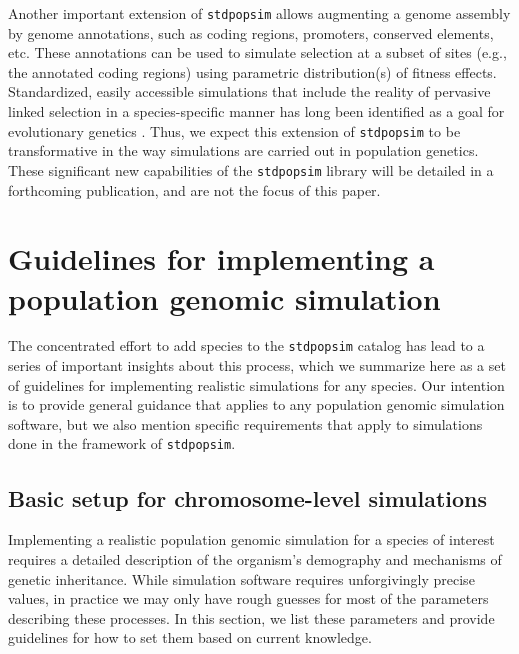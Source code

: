 \documentclass[hidelinks]{article}
\makeatletter
\newcommand{\stdpopsim}{\texttt{stdpopsim}\xspace}
\newcommand{\labelname}[1]{\def\@currentlabelname{#1}}
\makeatother
\begin{document}
Another important extension of \stdpopsim allows augmenting a genome assembly by genome annotations, such as coding regions, promoters, conserved elements, etc.
These annotations can be used to simulate selection at a subset of sites (e.g., the annotated coding regions)
using parametric distribution(s) of fitness effects.
Standardized, easily accessible simulations
that include the reality of pervasive linked selection in a species-specific
manner has long been identified as a goal for evolutionary genetics
\cite[e.g.,][]{McVicker2009,comeron2014background}.
Thus, we expect this extension of \stdpopsim to be transformative in the way simulations are carried out in population genetics.
These significant new capabilities of the \stdpopsim library will be detailed in a forthcoming publication,
and are not the focus of this paper.

\section*{Guidelines for implementing a population genomic simulation}
    \labelname{Guidelines}
    \label{sec:sim-guidelines}


The concentrated effort to add species to the \stdpopsim catalog
has lead to a series of important insights about this process,
which we summarize here as a set of guidelines
for implementing realistic simulations for any species.
Our intention is to provide general guidance that applies to any population genomic simulation software,
but we also mention specific requirements that apply to simulations done in the framework of \stdpopsim.

\subsection*{Basic setup for chromosome-level simulations}

Implementing a realistic population genomic simulation for a species of interest
requires a detailed description of the organism's demography and mechanisms of genetic inheritance.
While simulation software requires unforgivingly precise values,
in practice we may only have rough guesses for most of  the parameters describing these processes.
In this section, we list these parameters and
provide guidelines for how to set them based on current knowledge.
\end{document}
